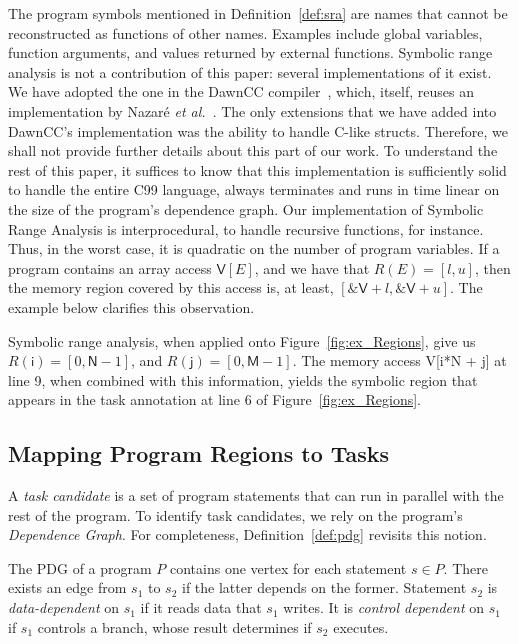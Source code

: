 \documentclass[sigplan,10pt,screen]{acmart}
\newcommand\dawn{\mbox{\textsf{DawnCC}}}
\begin{document}
The program symbols mentioned in Definition~\ref{def:sra} are names that cannot  be
reconstructed as functions of other names.
Examples include global variables, function arguments, and values returned by
external functions.
Symbolic range analysis is not a contribution of this paper: several
implementations of it exist.
We have adopted the one in the \dawn{} compiler~\cite{Mendonca17}, which, itself,
reuses an implementation by Nazar\'{e} {\em et al.}~\cite{Nazare14}.
The only extensions that we have added into \dawn 's implementation was
the ability to handle C-like \textsf{structs}.
Therefore, we shall not provide further details about this part of our work.
To understand the rest of this paper, it suffices to know that this implementation
is sufficiently solid to handle the entire C99 language, always terminates and runs in time 
linear on the size of the program's dependence graph.
Our implementation of Symbolic Range Analysis is interprocedural, to handle recursive 
functions, for instance.
Thus, in the worst case, it is quadratic on the number of program variables.
If a program contains an array access $\textsf{V}[E]$, and we have that
$R(E) = [l, u]$, then the memory region covered by this access is, at least,
$[\mathtt{\&}\textsf{V} + l, \mathtt{\&}\textsf{V} + u]$.
The example below clarifies this observation.

\begin{example}
\label{ex:sra}
Symbolic range analysis, when applied onto Figure~\ref{fig:ex_Regions}, give us
$R(\mathsf{i}) = [0, \mathsf{N} - 1]$, and $R(\mathsf{j}) = [0, \mathsf{M} - 1]$.
The memory access \textsf{V[i*N + j]} at line 9, when combined with this
information, yields the symbolic region that appears in the task annotation at
line 6 of Figure~\ref{fig:ex_Regions}.
\end{example}

\subsection{Mapping Program Regions to Tasks}
\label{sub:identification}

A {\em task candidate} is a set of program statements that can run in parallel
with the rest of the program.
To identify task candidates, we rely on the program's
{\em Dependence Graph}.
For completeness, Definition~\ref{def:pdg} revisits this notion.

\begin{definition}
\label{def:pdg}
The PDG of a program $P$ contains one vertex for each statement $s \in P$.
There exists an edge from $s_1$ to $s_2$ if the latter depends on the former.
Statement $s_2$ is {\em data-dependent} on $s_1$ if it reads data that $s_1$
writes.
It is {\em control dependent} on $s_1$ if $s_1$ controls a branch, whose result determines
if $s_2$ executes.
\end{definition}
\end{document}
